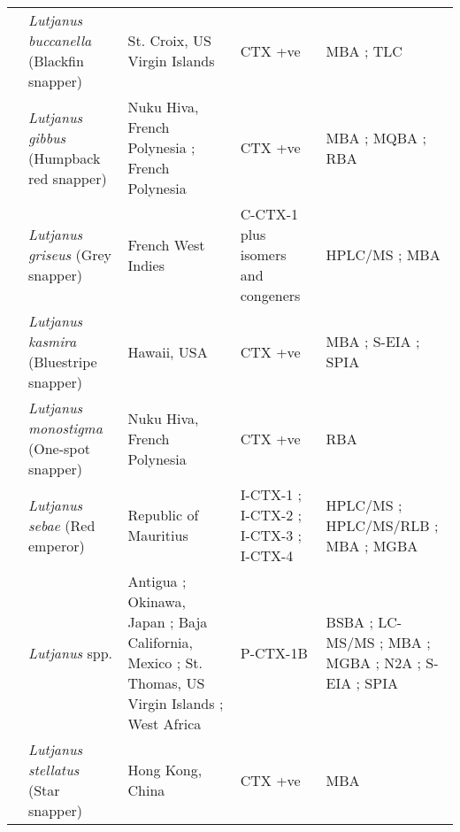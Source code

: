 \documentclass[12pt]{article}
\begin{document}
\begin{longtable}{  | p{2cm} | p{3cm} | p{4.5cm}  | p{2cm} | p{3cm}  | }
  & \emph{Lutjanus buccanella} (Blackfin snapper)  & St. Croix, US Virgin Islands \cite{hoffman1983mouse} & CTX +ve \cite{hoffman1983mouse} & MBA \cite{hoffman1983mouse}; TLC \cite{hoffman1983mouse} \\
  & \emph{Lutjanus gibbus} (Humpback red snapper) & Nuku Hiva, French Polynesia \cite{darius2007ciguatera}; French Polynesia \cite{bagnis1987use}  & CTX +ve \cite{darius2007ciguatera,bagnis1987use} & MBA \cite{bagnis1987use}; MQBA \cite{bagnis1987use}; RBA \cite{darius2007ciguatera} \\
  &  \emph{Lutjanus griseus} (Grey snapper) & French West Indies \cite{pottier2002analysis} & C-CTX-1 plus isomers and congeners \cite{pottier2002analysis} & HPLC/MS \cite{pottier2002analysis}; MBA \cite{pottier2002analysis}\\
  & \emph{Lutjanus kasmira} (Bluestripe snapper) & Hawaii, USA \cite{hokama1993evaluation} & CTX +ve \cite{hokama1993evaluation}  & MBA \cite{hokama1993evaluation}; S-EIA \cite{hokama1993evaluation}; SPIA \cite{hokama1993evaluation} \\
  & \emph{Lutjanus monostigma} (One-spot snapper)& Nuku Hiva, French Polynesia \cite{darius2007ciguatera} & CTX +ve \cite{darius2007ciguatera}  & RBA \cite{darius2007ciguatera} \\
  &  \emph{Lutjanus sebae} (Red emperor) & Republic of Mauritius \cite{hamilton2002multiple,hamilton2002isolation} & I-CTX-1 \cite{hamilton2002multiple,hamilton2002isolation}; I-CTX-2 \cite{hamilton2002multiple,hamilton2002isolation}; I-CTX-3 \cite{hamilton2002multiple,hamilton2002isolation}; I-CTX-4 \cite{hamilton2002multiple,hamilton2002isolation} & HPLC/MS \cite{hamilton2002multiple,hamilton2002isolation}; HPLC/MS/RLB \cite{hamilton2002multiple,hamilton2002isolation}; MBA \cite{hamilton2002multiple,hamilton2002isolation}; MGBA \cite{hamilton2002multiple,hamilton2002isolation} \\ %
  & \emph{Lutjanus} spp. & Antigua \cite{hokama1990simplified}; Okinawa, Japan \cite{yogi2011detailed}; Baja California, Mexico \cite{parrilla1992outbreaks}; St. Thomas, US Virgin Islands \cite{granade1976ciguatera}; West Africa \cite{bienfang2008ciguatera} & P-CTX-1B \cite{yogi2011detailed} & BSBA \cite{granade1976ciguatera}; LC-MS/MS \cite{yogi2011detailed}; MBA \cite{parrilla1992outbreaks}; MGBA \cite{granade1976ciguatera}; N2A \cite{bienfang2008ciguatera}; S-EIA \cite{hokama1990simplified}; SPIA \cite{hokama1990simplified} \\
  & \emph{Lutjanus stellatus} (Star snapper) & Hong Kong, China \cite{wong2008features} & CTX +ve \cite{wong2008features} & MBA \cite{wong2008features} \\

\end{longtable}
\end{document}
